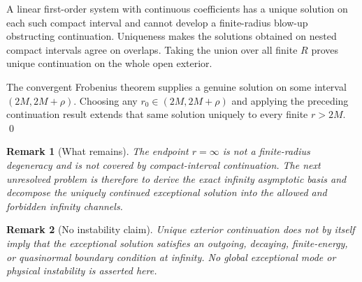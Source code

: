 \documentclass[11pt]{article}
\newtheorem{remark}{Remark}
\begin{document}
A linear first-order system with continuous coefficients has a unique
solution on each such compact interval and cannot develop a
finite-radius blow-up obstructing continuation.  Uniqueness makes the
solutions obtained on nested compact intervals agree on overlaps.
Taking the union over all finite $R$ proves unique continuation on the
whole open exterior.

The convergent Frobenius theorem supplies a genuine solution on some
interval $(2M,2M+\rho)$.  Choosing any
$r_0\in(2M,2M+\rho)$ and applying the preceding continuation result
extends that same solution uniquely to every finite $r>2M$.
\qed

\begin{remark}[What remains]
The endpoint $r=\infty$ is not a finite-radius degeneracy and is not
covered by compact-interval continuation.  The next unresolved
problem is therefore to derive the exact infinity asymptotic basis and
decompose the uniquely continued exceptional solution into the
allowed and forbidden infinity channels.
\end{remark}

\begin{remark}[No instability claim]
Unique exterior continuation does not by itself imply that the
exceptional solution satisfies an outgoing, decaying, finite-energy,
or quasinormal boundary condition at infinity.  No global exceptional
mode or physical instability is asserted here.
\end{remark}
\end{document}
